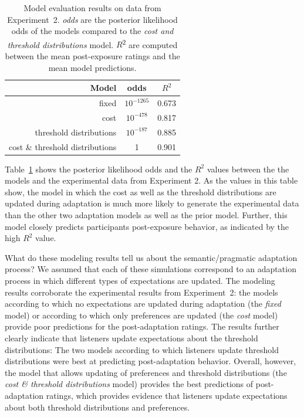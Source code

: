 \begin{table}
\center
\begin{tabular}{r | c | c }
Model &   odds  &  $R^2$ \\ \midrule
fixed & $10^{-1265}$ &  0.673       \\
cost & $10^{-478}$ & 0.817     \\
threshold distributions & $10^{-187}$ &  0.885 \\
cost \& threshold distributions & 1 &  0.901 \\
\end{tabular}
\caption{Model evaluation results on data from Experiment~2.   \textit{odds} are the posterior likelihood odds of the models compared to the \textit{cost and threshold distributions} model.  $R$\textsuperscript{$2$} are computed between  the mean post-exposure ratings and the mean model predictions. \label{tbl:model-comparison-replication}}
\end{table}

Table~\ref{tbl:model-comparison-replication} shows 
the posterior likelihood odds and the $R^2$ values between the the models and the experimental data from Experiment 2. 
As the values in this table show, the model in which the cost as well as the threshold 
distributions are updated during adaptation is much more likely to generate the experimental data than the other two adaptation models
as well as the prior model. Further, this model closely predicts participants post-exposure behavior, as indicated by the high $R^2$ value. 
 
 
What do these modeling results tell us about the semantic/pragmatic adaptation process? 
We assumed that each of these simulations
correspond to an adaptation process in which different types of expectations are  updated.
The modeling results corroborate the experimental results from Experiment~2:
the models according to which no expectations are updated during adaptation (the \textit{fixed} model) 
or according to which only preferences are updated (the \textit{cost} model) provide poor predictions for the post-adaptation
ratings. The results further clearly indicate that listeners update expectations about the threshold distributions: The two models according to 
which listeners update threshold distributions were best at predicting post-adaptation behavior. Overall, however, the model that allows updating
of preferences and threshold distributions (the \textit{cost \& threshold distributions} model) provides the best predictions of post-adaptation ratings, which
provides evidence that listeners update expectations about both {threshold distributions} and {preferences}. 


